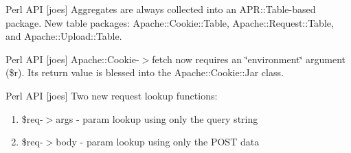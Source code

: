 \begin{CompactItemize}
\item 
Perl API [joes] Aggregates are always collected into an APR::Table-based package. New table packages: Apache::Cookie::Table, Apache::Request::Table, and Apache::Upload::Table.\end{CompactItemize}
\begin{CompactItemize}
\item 
Perl API [joes] Apache::Cookie-$>$fetch now requires an \char`\"{}environment\char`\"{} argument (\$r). Its return value is blessed into the Apache::Cookie::Jar class.\end{CompactItemize}
\begin{CompactItemize}
\item 
Perl API [joes] Two new request lookup functions:\begin{enumerate}
\item 
\$req-$>$args - param lookup using only the query string\item 
\$req-$>$body - param lookup using only the POST data\end{enumerate}
\end{CompactItemize}
